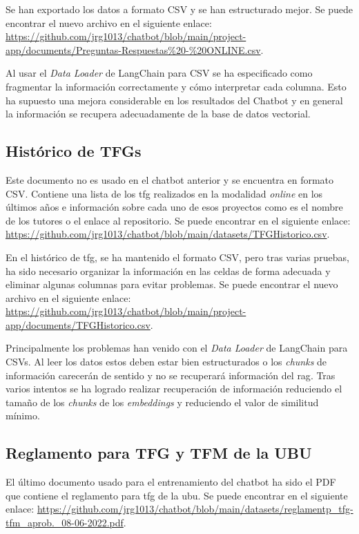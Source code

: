 Se han exportado los datos a formato CSV y se han estructurado mejor. Se puede encontrar el nuevo archivo en el siguiente enlace: \url{https://github.com/jrg1013/chatbot/blob/main/project-app/documents/Preguntas-Respuestas%20-%20ONLINE.csv}.

Al usar el \textit{Data Loader} de LangChain para CSV se ha especificado como fragmentar la información correctamente y cómo interpretar cada columna. Esto ha supuesto una mejora considerable en los resultados del Chatbot y en general la información se recupera adecuadamente de la base de datos vectorial.

\subsection{Histórico de TFGs}

Este documento no es usado en el chatbot anterior y se encuentra en formato CSV. Contiene una lista de los \acrshort{tfg} realizados en la modalidad \textit{online} en los últimos años e información sobre cada uno de esos proyectos como es el nombre de los tutores o el enlace al repositorio. Se puede encontrar en el siguiente enlace: \url{https://github.com/jrg1013/chatbot/blob/main/datasets/TFGHistorico.csv}.

En el histórico de \acrshort{tfg}, se ha mantenido el formato CSV, pero tras varias pruebas, ha sido necesario organizar la información en las celdas de forma adecuada y eliminar algunas columnas para evitar problemas. Se puede encontrar el nuevo archivo en el siguiente enlace: \url{https://github.com/jrg1013/chatbot/blob/main/project-app/documents/TFGHistorico.csv}.

Principalmente los problemas han venido con el \textit{Data Loader} de LangChain para CSVs. Al leer los datos estos deben estar bien estructurados o los \textit{chunks} de información carecerán de sentido y no se recuperará información del \acrshort{rag}. Tras varios intentos se ha logrado realizar recuperación de información reduciendo el tamaño de los \textit{chunks} de los \textit{embeddings} y reduciendo el valor de similitud mínimo.

\subsection{Reglamento para TFG y TFM de la UBU}

El último documento usado para el entrenamiento del chatbot ha sido el PDF que contiene el reglamento para \acrshort{tfg} de la \acrshort{ubu}. Se puede encontrar en el siguiente enlace: \url{https://github.com/jrg1013/chatbot/blob/main/datasets/reglamentp_tfg-tfm_aprob._08-06-2022.pdf}.

